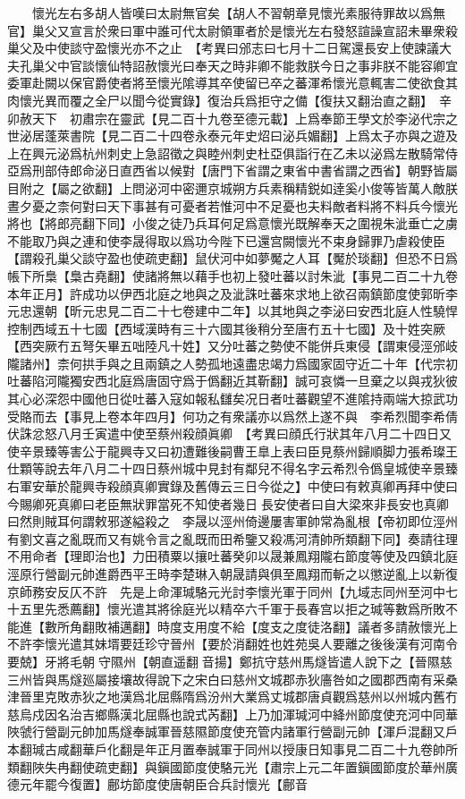 　　懷光左右多胡人皆嘆曰太尉無官矣【胡人不習朝章見懷光素服待罪故以爲無官】巢父又宣言於衆曰軍中誰可代太尉領軍者於是懷光左右發怒諠譟宣詔未畢衆殺巢父及中使談守盈懷光亦不之止　【考異曰邠志曰七月十二日駕還長安上使諫議大夫孔巢父中官談懷仙特詔赦懷光曰奉天之時非卿不能救朕今日之事非朕不能容卿宜委軍赴闕以保官爵使者將至懷光隂導其卒使留已卒之蕃渾希懷光意輒害二使欲食其肉懷光異而覆之全尸以聞今從實錄】復治兵爲拒守之備【復扶又翻治直之翻】　辛卯赦天下　初肅宗在靈武【見二百十九卷至德元載】上爲奉節王學文於李泌代宗之世泌居蓬萊書院【見二百二十四卷永泰元年史炤曰泌兵媚翻】上爲太子亦與之遊及上在興元泌爲杭州刺史上急詔徵之與睦州刺史杜亞俱詣行在乙未以泌爲左散騎常侍亞爲刑部侍郎命泌日直西省以候對【唐門下省謂之東省中書省謂之西省】朝野皆屬目附之【屬之欲翻】上問泌河中密邇京城朔方兵素稱精鋭如逹奚小俊等皆萬人敵朕晝夕憂之柰何對曰天下事甚有可憂者若惟河中不足憂也夫料敵者料將不料兵今懷光將也【將郎亮翻下同】小俊之徒乃兵耳何足爲意懷光既解奉天之圍視朱泚垂亡之虜不能取乃與之連和使李晟得取以爲功今陛下已還宫闕懷光不束身歸罪乃虐殺使臣【謂殺孔巢父談守盈也使疏吏翻】鼠伏河中如夢魘之人耳【魘於琰翻】但恐不日爲帳下所梟【梟古堯翻】使諸將無以藉手也初上發吐蕃以討朱泚【事見二百二十九卷本年正月】許成功以伊西北庭之地與之及泚誅吐蕃來求地上欲召兩鎮節度使郭昕李元忠還朝【昕元忠見二百二十七卷建中二年】以其地與之李泌曰安西北庭人性驍悍控制西域五十七國【西域漢時有三十六國其後稍分至唐冇五十七國】及十姓突厥【西突厥冇五弩矢畢五咄陸凡十姓】又分吐蕃之勢使不能併兵東侵【謂東侵涇邠岐隴諸州】柰何拱手與之且兩鎮之人勢孤地遠盡忠竭力爲國家固守近二十年【代宗初吐蕃陷河隴獨安西北庭爲唐固守爲于僞翻近其靳翻】誠可哀憐一旦棄之以與戎狄彼其心必深怨中國他日從吐蕃入寇如報私讎矣况日者吐蕃觀望不進隂持兩端大掠武功受賂而去【事見上卷本年四月】何功之有衆議亦以爲然上遂不與　李希烈聞李希倩伏誅忿怒八月壬寅遣中使至蔡州殺顔眞卿　【考異曰顔氏行狀其年八月二十四日又使辛景臻等害公于龍興寺又曰初遭難後嗣曹王臯上表曰臣見蔡州歸順脚力張希璨王仕顆等說去年八月二十四日蔡州城中見封有鄰兒不得名字云希烈令僞皇城使辛景臻右軍安華於龍興寺殺顔真卿實錄及舊傳云三日今從之】中使曰有敕真卿再拜中使曰今賜卿死真卿曰老臣無狀罪當死不知使者幾日長安使者曰自大梁來非長安也真卿曰然則賊耳何謂敕邪遂縊殺之　李晟以涇州倚邊屢害軍帥常為亂根【帝初即位涇州有劉文喜之亂既而又有姚令言之亂既而田希鑒又殺馮河清帥所類翻下同】奏請往理不用命者【理即治也】力田積粟以攘吐蕃癸卯以晟兼鳳翔隴右節度等使及四鎮北庭涇原行營副元帥進爵西平王時李楚琳入朝晟請與俱至鳳翔而斬之以懲逆亂上以新復京師務安反仄不許　先是上命渾瑊駱元光討李懷光軍于同州【九域志同州至河中七十五里先悉薦翻】懷光遣其將徐庭光以精卒六千軍于長春宫以拒之瑊等數爲所敗不能進【數所角翻敗補邁翻】時度支用度不給【度支之度徒洛翻】議者多請赦懷光上不許李懷光遣其妹壻要廷珍守晉州【要於消翻姓也姓苑吳人要離之後後漢有河南令要兢】牙將毛朝守隰州【朝直遥翻音揚】鄭抗守慈州馬燧皆遣人說下之【晉隰慈三州皆與馬燧廵屬接壤故得說下之宋白曰慈州文城郡赤狄廧咎如之國郡西南有采桑津晉里克敗赤狄之地漢爲北屈縣隋爲汾州大業爲丈城郡唐貞觀爲慈州以州城内舊冇慈烏戍因名治吉鄉縣漢北屈縣也說式芮翻】上乃加渾瑊河中絳州節度使充河中同華陜虢行營副元帥加馬燧奉誠軍晉慈隰節度使充管内諸軍行營副元帥【渾戶混翻又戶本翻瑊古咸翻華戶化翻是年正月置奉誠軍于同州以授康日知事見二百二十九卷帥所類翻陜失冉翻使疏吏翻】與鎭國節度使駱元光【肅宗上元二年置鎭國節度於華州廣德元年罷今復置】鄜坊節度使唐朝臣合兵討懷光【鄜音